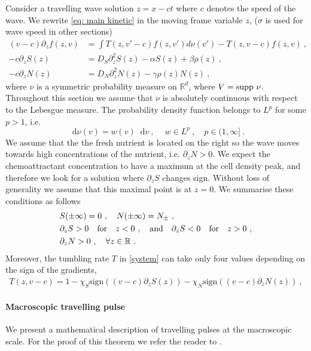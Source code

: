 \documentclass[11pt,twoside]{article}
\numberwithin{equation}{section}
\newcommand*\diff{\mathop{}\!\mathrm{d}}
\theoremstyle{plain}
\theoremstyle{nonumberplain}
\begin{document}
Consider a travelling wave solution $z=x-ct$ where $c$ denotes the speed of the wave. We rewrite \eqref{eq: main kinetic} in the moving frame variable $z$, {\color{red} ($\sigma$ is used for wave speed in other sections)}
\begin{equation}
\begin{aligned}\label{system}
(v-c)\partial_zf(z,v)&=\int T(z,v'-c)f(z,v')d\nu(v')-T(z,v-c)f(z,v)\ ,\\
-c\partial_z S(z)&=D_S\partial_{z}^2S(z)-\alpha S(z)+\beta \rho(z)\ ,\\
-c\partial_zN(z)&=D_N\partial_{z}^2N(z)-\gamma\rho(z) N(z)
\ ,
\end{aligned}
\end{equation}
where $\nu$ is a symmetric probability measure on $\mathbb{R}^d$, where $V=\textnormal{supp}\ \nu$. Throughout this section we assume that $\nu$ is absolutely continuous with respect to the Lebesgue measure. The probability density function belongs to $L^p$ for some $p > 1$, i.e.
\[
\diff \nu (v)=w(v)\diff v\ ,\ \quad w\in L^p\ , \quad p\in(1,\infty]\ .
\]
We assume that the the fresh nutrient is located on the right so the wave moves towards high concentrations of the nutrient, i.e.  $\partial_zN>0$. We expect the chemoattractant concentration to have a maximum at the cell density peak, and therefore we look for a solution where  $\partial_zS$ changes sign. Without loss of generality we assume that this maximal point is at $z=0$.  We summarise these conditions as follows
\begin{equation}
\begin{aligned}
 &S(\pm \infty)=0\ ,\quad N(\pm\infty)=N_\pm\ ,\\
&\partial_z S>0  \quad  \textrm{for}\quad z<0\ , \quad\textnormal{and}\quad\partial_z S<0 \quad \textrm{for}\quad z>0\ ,\\
&\partial_zN>0\ ,\quad\forall z\in\mathbb{R}\ .\label{eq: cond chemicals}
\end{aligned}
\end{equation}
Moreover, the tumbling rate $T$ in \eqref{system} can take only four values depending on the sign of the gradients,
\begin{eqnarray}\label{tumbl}
   T(z,v-c)=1-\chi_S \textrm{sign}((v-c)\partial_z S(z))-\chi_N \textrm{sign}((v-c)\partial_z N(z))\ ,
\end{eqnarray}

\paragraph{Macroscopic travelling pulse}
We present a mathematical description of travelling pulses at the macroscopic scale. For the proof of this theorem we refer the reader to \cite{calvez2016chemotactic}.
\end{document}
